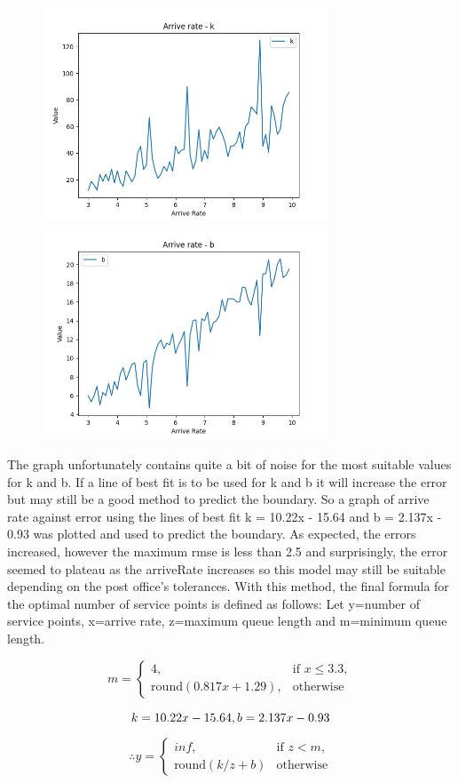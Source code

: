\documentclass{article}
\begin{document}
\begin{figure}[h]
\includegraphics[width=8.5cm]{arrive_k.png}
\includegraphics[width=8.5cm]{arrive_b.png}
\end{figure}

The graph unfortunately contains quite a bit of noise for the most suitable values for k and b. If a line of best fit is to be used for k and b it will increase the error but may still be a good method to predict the boundary. So a graph of arrive rate against error using the lines of best fit k = 10.22x - 15.64 and b = 2.137x - 0.93 was plotted and used to predict the boundary.
As expected, the errors increased, however the maximum rmse is less than 2.5 and surprisingly, the error seemed to plateau as the arriveRate increases so this model may still be suitable depending on the post office's tolerances. 
With this method, the final formula for the optimal number of service points is defined as follows:
Let y=number of service points, x=arrive rate, z=maximum queue length and m=minimum queue length.

\[
m = 
\begin{cases}
    4, & \text{if } x \leq 3.3,\\
    \text{round}(0.817x + 1.29), & \text{otherwise}
\end{cases}
\]

\[
k = 10.22x - 15.64,\\
b = 2.137x - 0.93\\
\]
\[
\begin{split}
\therefore
y = 
\begin{cases}
    inf, & \text{if } z < m,\\
    \text{round}(k/z + b) & \text{otherwise}
\end{cases}
\end{split}
\]
\end{document}
